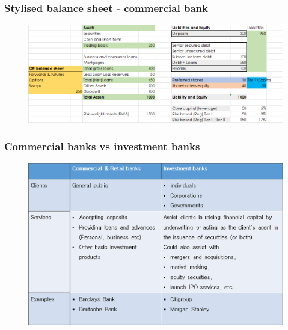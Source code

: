 \documentclass[11pt]{beamer}
\begin{document}
\begin{frame}
\frametitle{Stylised balance sheet - commercial bank}
\begin{figure}
	\includegraphics[width=1\textwidth]{TotalBS.png}
\end{figure}

\end{frame}



\begin{frame}
\frametitle{Commercial banks vs investment banks}
\begin{figure}
\includegraphics[width=\textwidth]{commret.png}
\end{figure}


\end{frame}



\end{document}
